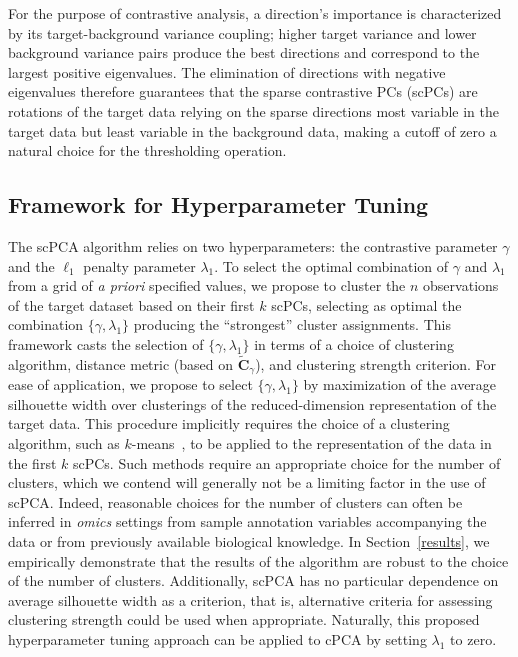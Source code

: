 For the purpose of contrastive analysis, a direction's importance is
characterized by its target-background variance coupling; higher target variance
and lower background variance pairs produce the best directions \citep{Abid2018}
and correspond to the largest positive eigenvalues. The elimination of directions with
negative eigenvalues therefore guarantees that the sparse contrastive PCs (scPCs) are
rotations of the target data relying on the sparse directions most
variable in the target data but least variable in the background data, making
a cutoff of zero a natural choice for the thresholding operation.

\subsection{Framework for Hyperparameter Tuning}\label{hyp_tune}

The scPCA algorithm relies on two hyperparameters: the contrastive parameter $\gamma$ and the $\ell_1$ penalty parameter $\lambda_1$. To select the optimal combination of $\gamma$ and $\lambda_1$ from a grid of \textit{a priori} specified values, we propose to cluster the $n$ observations of the target dataset based on their first $k$ scPCs, selecting as optimal the combination $\{\gamma, \lambda_1\}$ producing the ``strongest'' cluster assignments. This framework casts the selection of $\{\gamma, \lambda_1\}$ in terms of a choice of clustering algorithm, distance metric (based on $\widetilde{\mathbf{C}}_{\gamma}$), and clustering strength criterion. For ease of application, we propose to select $\{\gamma, \lambda_1\}$ by maximization of the average silhouette width over clusterings of the reduced-dimension representation of the target data. This procedure implicitly requires the choice of a clustering algorithm, such as $k$-means~\citep{kmeans}, to be applied to the representation of the data in the first $k$ scPCs. Such methods require an appropriate choice for the number of clusters, which we contend will generally not be a limiting factor in the use of scPCA. Indeed, reasonable choices for the number of clusters can often be inferred in \textit{omics} settings from sample annotation variables accompanying the data or from previously available biological knowledge. In Section~\ref{results}, we empirically demonstrate that the results of the algorithm are robust to the choice of the number of clusters. Additionally, scPCA has no particular dependence on average silhouette width as a criterion, that is, alternative criteria for assessing clustering strength could be used when appropriate. %
Naturally, this proposed hyperparameter tuning approach can be applied to cPCA by setting $\lambda_1$ to zero.

